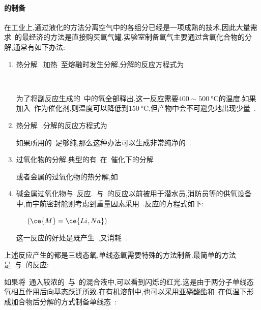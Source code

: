 \documentclass{ctexbook}
\begin{document}
\paragraph{的制备}
在工业上,通过液化的方法分离空气中的各组分已经是一项成熟的技术,因此大量需求~的最经济的方法是直接购买氧气罐.实验室制备氧气主要通过含氧化合物的分解,通常有如下办法:
\begin{enumerate}[label=\tbf{\roman*.},leftmargin=*]
    \item 热分解~.加热~至熔融时发生分解,分解的反应方程式为
        \begin{tightcenter}
            \\
        \end{tightcenter}
        为了将副反应生成的~中的氧全部释出,这一反应需要$400\sim\SI{500}{\celsius}$的温度.如果加入~作为催化剂,则温度可以降低到$\SI{150}{\celsius}$,但产物中会不可避免地出现少量~.
    \item 热分解~.分解的反应方程式为
        \begin{tightcenter}
        \end{tightcenter}
        如果所用的~足够纯,那么这种办法可以生成非常纯净的~.
    \item 过氧化物的分解.典型的有~在~催化下的分解
        \begin{tightcenter}
        \end{tightcenter}
        或者金属的过氧化物的热分解,如
        \begin{tightcenter}
        \end{tightcenter}
    \item 碱金属过氧化物与~反应.~与~的反应以前被用于潜水员,消防员等的供氧设备中,而宇航密封舱则考虑到重量因素采用~.反应的方程式如下:
        \begin{tightcenter}
            \ \ \ $\left(\ce{M}=\ce{Li,Na}\right)$
        \end{tightcenter}
        这一反应的好处是既产生~,又消耗~.
\end{enumerate}
上述反应产生的都是三线态氧.单线态氧需要特殊的方法制备.最简单的方法是~与~的反应:
\begin{tightcenter}
\end{tightcenter}
如果将~通入较浓的~与~的混合液中,可以看到闪烁的红光.这是由于两分子单线态氧相互作用后向基态跃迁所致.在有机溶剂中,也可以采用亚磷酸酯和~在低温下形成加合物后分解的方式制备单线态~:
\begin{tightcenter}
    \\
\end{tightcenter}
\end{document}
